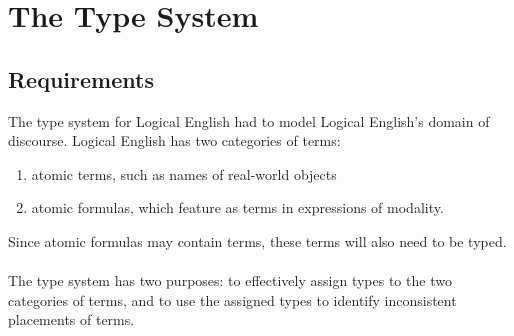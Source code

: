 \documentclass[../main.tex]{subfiles}
\begin{document}
\chapter{The Type System}
\section{Requirements}
\label{section:type-system-requirements}

The type system for Logical English had to model Logical English's domain of discourse. Logical English has two categories of terms:
\begin{enumerate}
    \item atomic terms, such as names of real-world objects
    \item atomic formulas, which feature as terms in expressions of modality.
\end{enumerate}
Since atomic formulas may contain terms, these terms will also need to be typed.
\\
\\
The type system has two purposes: to effectively assign types to the two categories of terms, and to use the assigned types to identify inconsistent placements of terms. 


\end{document}
